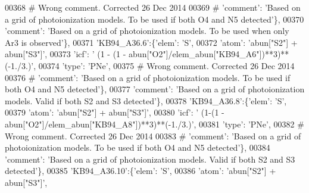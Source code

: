 \begin{DoxyCode}
00368 \textcolor{comment}{# Wrong comment. Corrected 26 Dec 2014}
00369 \textcolor{comment}{#                                      'comment': 'Based on a grid of photoionization models. To be used if
       both O4 and N5 detected'\},}
00370                                      \textcolor{stringliteral}{'comment'}: \textcolor{stringliteral}{'Based on a grid of photoionization models. To be used when
       only Ar3 is observed'}\},
00371                          \textcolor{stringliteral}{'KB94\_A36.6'}:\{\textcolor{stringliteral}{'elem'}: \textcolor{stringliteral}{'S'},
00372                                      \textcolor{stringliteral}{'atom'}: \textcolor{stringliteral}{'abun["S2"] + abun["S3"]'},
00373                                      \textcolor{stringliteral}{'icf'}: \textcolor{stringliteral}{' (1 - (1 - abun["O2"]/elem\_abun["KB94\_A6"])**3)**(-1./3.)'},
00374                                       \textcolor{stringliteral}{'type'}: \textcolor{stringliteral}{'PNe'},
00375 \textcolor{comment}{# Wrong comment. Corrected 26 Dec 2014}
00376 \textcolor{comment}{#                                      'comment': 'Based on a grid of photoionization models. To be used if
       both O4 and N5 detected'\},}
00377                                       \textcolor{stringliteral}{'comment'}: \textcolor{stringliteral}{'Based on a grid of photoionization models. Valid if both
       S2 and S3 detected'}\},
00378                          \textcolor{stringliteral}{'KB94\_A36.8'}:\{\textcolor{stringliteral}{'elem'}: \textcolor{stringliteral}{'S'},
00379                                      \textcolor{stringliteral}{'atom'}: \textcolor{stringliteral}{'abun["S2"] + abun["S3"]'},
00380                                      \textcolor{stringliteral}{'icf'}: \textcolor{stringliteral}{' (1-(1 - abun["O2"]/elem\_abun["KB94\_A8"])**3)**(-1./3.)'},
00381                                       \textcolor{stringliteral}{'type'}: \textcolor{stringliteral}{'PNe'},
00382 \textcolor{comment}{# Wrong comment. Corrected 26 Dec 2014}
00383 \textcolor{comment}{#                                      'comment': 'Based on a grid of photoionization models. To be used if
       both O4 and N5 detected'\},}
00384                                       \textcolor{stringliteral}{'comment'}: \textcolor{stringliteral}{'Based on a grid of photoionization models. Valid if both
       S2 and S3 detected'}\},
00385                          \textcolor{stringliteral}{'KB94\_A36.10'}:\{\textcolor{stringliteral}{'elem'}: \textcolor{stringliteral}{'S'},
00386                                      \textcolor{stringliteral}{'atom'}: \textcolor{stringliteral}{'abun["S2"] + abun["S3"]'},

\end{DoxyCode}
